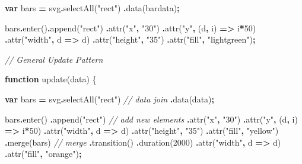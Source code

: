 \documentclass[
  openany]{book}
\newenvironment{Shaded}{\begin{snugshade}}{\end{snugshade}}
\newcommand{\CommentTok}[1]{\textcolor[rgb]{0.56,0.35,0.01}{\textit{#1}}}
\newcommand{\DecValTok}[1]{\textcolor[rgb]{0.00,0.00,0.81}{#1}}
\newcommand{\FunctionTok}[1]{\textcolor[rgb]{0.00,0.00,0.00}{#1}}
\newcommand{\KeywordTok}[1]{\textcolor[rgb]{0.13,0.29,0.53}{\textbf{#1}}}
\newcommand{\NormalTok}[1]{#1}
\newcommand{\OperatorTok}[1]{\textcolor[rgb]{0.81,0.36,0.00}{\textbf{#1}}}
\newcommand{\StringTok}[1]{\textcolor[rgb]{0.31,0.60,0.02}{#1}}
\begin{document}
\begin{Shaded}
\begin{Highlighting}[]
\KeywordTok{var}\NormalTok{ bars }\OperatorTok{=}\NormalTok{ svg}\OperatorTok{.}\FunctionTok{selectAll}\NormalTok{(}\StringTok{"rect"}\NormalTok{)}
  \OperatorTok{.}\FunctionTok{data}\NormalTok{(bardata)}\OperatorTok{;}

\NormalTok{bars}\OperatorTok{.}\FunctionTok{enter}\NormalTok{()}\OperatorTok{.}\FunctionTok{append}\NormalTok{(}\StringTok{"rect"}\NormalTok{)}
  \OperatorTok{.}\FunctionTok{attr}\NormalTok{(}\StringTok{"x"}\OperatorTok{,} \StringTok{"30"}\NormalTok{)}
  \OperatorTok{.}\FunctionTok{attr}\NormalTok{(}\StringTok{"y"}\OperatorTok{,}\NormalTok{ (d}\OperatorTok{,}\NormalTok{ i) }\KeywordTok{=\textgreater{}}\NormalTok{ i}\OperatorTok{*}\DecValTok{50}\NormalTok{)}
  \OperatorTok{.}\FunctionTok{attr}\NormalTok{(}\StringTok{"width"}\OperatorTok{,}\NormalTok{ d }\KeywordTok{=\textgreater{}}\NormalTok{ d)}
  \OperatorTok{.}\FunctionTok{attr}\NormalTok{(}\StringTok{"height"}\OperatorTok{,} \StringTok{"35"}\NormalTok{)}
  \OperatorTok{.}\FunctionTok{attr}\NormalTok{(}\StringTok{"fill"}\OperatorTok{,} \StringTok{"lightgreen"}\NormalTok{)}\OperatorTok{;}

\CommentTok{// General Update Pattern}

\KeywordTok{function} \FunctionTok{update}\NormalTok{(data) \{}

  \KeywordTok{var}\NormalTok{ bars }\OperatorTok{=}\NormalTok{ svg}\OperatorTok{.}\FunctionTok{selectAll}\NormalTok{(}\StringTok{"rect"}\NormalTok{)    }\CommentTok{// data join}
    \OperatorTok{.}\FunctionTok{data}\NormalTok{(data)}\OperatorTok{;}

\NormalTok{    bars}\OperatorTok{.}\FunctionTok{enter}\NormalTok{()}
      \OperatorTok{.}\FunctionTok{append}\NormalTok{(}\StringTok{"rect"}\NormalTok{)    }\CommentTok{// add new elements}
        \OperatorTok{.}\FunctionTok{attr}\NormalTok{(}\StringTok{"x"}\OperatorTok{,} \StringTok{"30"}\NormalTok{)}
        \OperatorTok{.}\FunctionTok{attr}\NormalTok{(}\StringTok{"y"}\OperatorTok{,}\NormalTok{ (d}\OperatorTok{,}\NormalTok{ i) }\KeywordTok{=\textgreater{}}\NormalTok{ i}\OperatorTok{*}\DecValTok{50}\NormalTok{)}
        \OperatorTok{.}\FunctionTok{attr}\NormalTok{(}\StringTok{"width"}\OperatorTok{,}\NormalTok{ d }\KeywordTok{=\textgreater{}}\NormalTok{ d)}
        \OperatorTok{.}\FunctionTok{attr}\NormalTok{(}\StringTok{"height"}\OperatorTok{,} \StringTok{"35"}\NormalTok{)}
        \OperatorTok{.}\FunctionTok{attr}\NormalTok{(}\StringTok{"fill"}\OperatorTok{,} \StringTok{"yellow"}\NormalTok{)}
      \OperatorTok{.}\FunctionTok{merge}\NormalTok{(bars)    }\CommentTok{// merge}
        \OperatorTok{.}\FunctionTok{transition}\NormalTok{()}
        \OperatorTok{.}\FunctionTok{duration}\NormalTok{(}\DecValTok{2000}\NormalTok{)}
        \OperatorTok{.}\FunctionTok{attr}\NormalTok{(}\StringTok{"width"}\OperatorTok{,}\NormalTok{ d }\KeywordTok{=\textgreater{}}\NormalTok{ d)}
        \OperatorTok{.}\FunctionTok{attr}\NormalTok{(}\StringTok{"fill"}\OperatorTok{,} \StringTok{"orange"}\NormalTok{)}\OperatorTok{;}


\end{Highlighting}
\end{Shaded}
\end{document}
